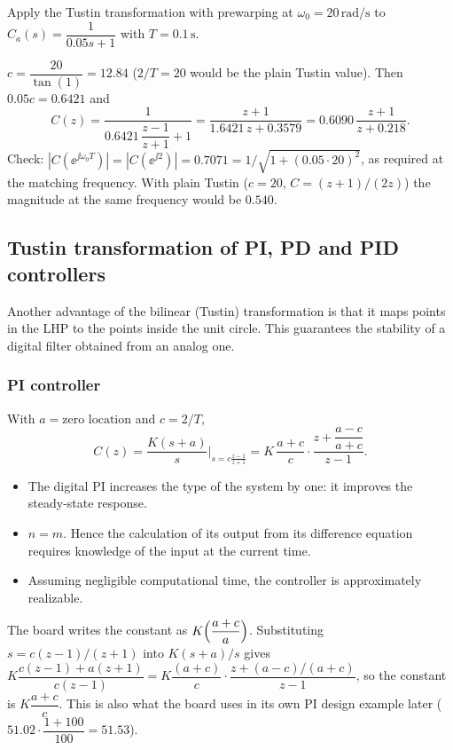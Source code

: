 \begin{problem}
Apply the Tustin transformation with prewarping at $\omega_0=20\,\mathrm{rad/s}$ to $C_a(s)=\dfrac{1}{0.05s+1}$ with $T=0.1\,\mathrm{s}$.
\end{problem}
\begin{solution}
$c=\dfrac{20}{\tan(1)}=12.84$ ($2/T=20$ would be the plain Tustin value). Then $0.05c=0.6421$ and
\[
  C(z)=\frac{1}{0.6421\,\dfrac{z-1}{z+1}+1}=\frac{z+1}{1.6421\,z+0.3579}=0.6090\,\frac{z+1}{z+0.218}.
\]
Check: $|C(\ee^{\jj\omega_0T})|=|C(\ee^{\jj2})|=0.7071=1/\sqrt{1+(0.05\cdot20)^{2}}$, as required at the matching frequency.
With plain Tustin ($c=20$, $C=(z+1)/(2z)$) the magnitude at the same frequency would be $0.540$.
\end{solution}

\subsection{Tustin transformation of PI, PD and PID controllers}
Another advantage of the bilinear (Tustin) transformation is that it maps points in the LHP to the points inside the unit
circle. This guarantees the stability of a digital filter obtained from an analog one.

\subsubsection*{PI controller}
With $a=\text{zero location}$ and $c=2/T$,
\begin{equation}
  C(z)=\frac{K(s+a)}{s}\Big|_{s=c\frac{z-1}{z+1}}=K\,\frac{a+c}{c}\cdot\frac{z+\dfrac{a-c}{a+c}}{z-1}.
\end{equation}
\begin{itemize}
  \item The digital PI increases the type of the system by one: it improves the steady-state response.
  \item $n=m$. Hence the calculation of its output from its difference equation requires knowledge of the input at the
        current time.
  \item Assuming negligible computational time, the controller is approximately realizable.
\end{itemize}
\begin{boardnote}
The board writes the constant as $K\Bigl(\dfrac{a+c}{a}\Bigr)$. Substituting $s=c(z-1)/(z+1)$ into $K(s+a)/s$ gives
$K\dfrac{c(z-1)+a(z+1)}{c(z-1)}=K\dfrac{(a+c)}{c}\cdot\dfrac{z+(a-c)/(a+c)}{z-1}$, so the constant is $K\dfrac{a+c}{c}$.
This is also what the board uses in its own PI design example later ($51.02\cdot\dfrac{1+100}{100}=51.53$).
\end{boardnote}


